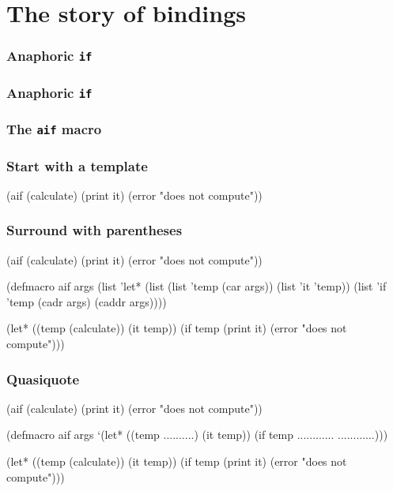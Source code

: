 \documentclass[hyperref={bookmarks=false}]{beamer}
\begin{document}
\section{The story of bindings}

\begin{frame}[fragile]
\frametitle<1>{Anaphoric \texttt{if}}
\frametitle<2>{Anaphoric \texttt{if}}
\frametitle<3>{The \texttt{aif} macro}
\frametitle<4->{Start with a template}
\begin{semiverbatim}
(aif (calculate)
  (print it)
  (error "does not compute"))


\end{semiverbatim}
\end{frame}

\begin{frame}[fragile]
\frametitle{Surround with parentheses}
\begin{semiverbatim}
(aif (calculate)
  (print it)
  (error "does not compute"))

(defmacro aif args
  \alert{(list '}let* \alert{(list (list '}temp  (car args))
  \alert{                  (list '}it \alert{'}temp\alert{))}
    \alert{(list '}if \alert{'}temp
             (cadr args)
             (caddr args)\alert{))})

(let* ((temp (calculate))
       (it temp))
  (if temp
    (print it)
    (error "does not compute")))
\end{semiverbatim}
\end{frame}

\begin{frame}[fragile]
\frametitle{Quasiquote}
\begin{semiverbatim}
(aif (calculate)
  (print it)
  (error "does not compute"))

(defmacro aif args
  \alert{     `}(let*            ((temp  ..........)
                          (it  temp))
          (if  temp
             ............
             ............)))

(let* ((temp (calculate))
       (it temp))
  (if temp
    (print it)
    (error "does not compute")))
\end{semiverbatim}
\end{frame}
\end{document}
